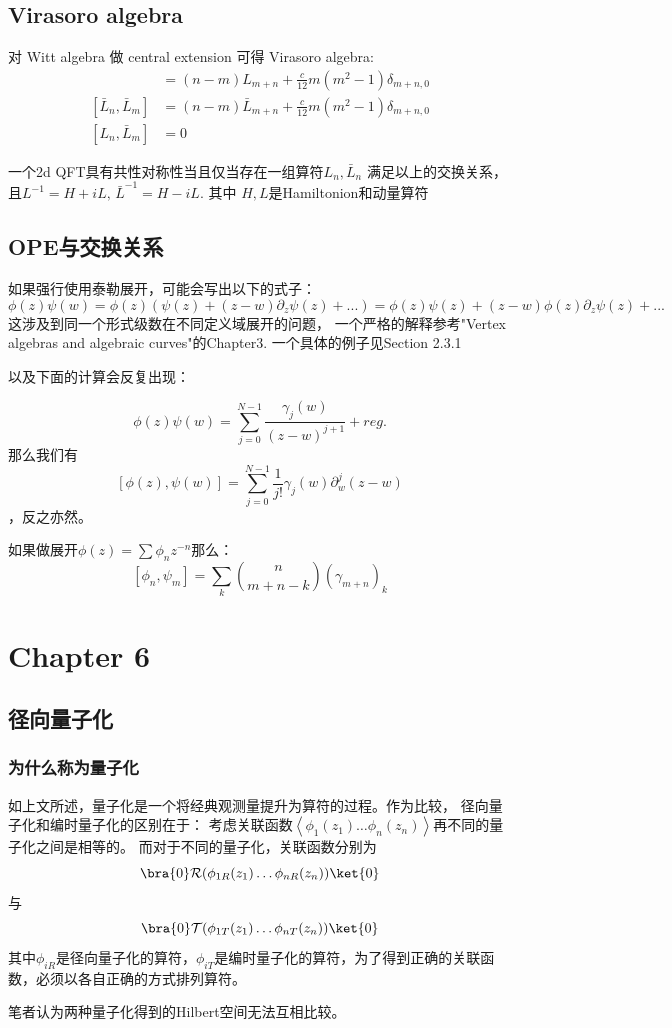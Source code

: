 \subsection{Virasoro algebra}
对 Witt algebra 做 central extension 可得 Virasoro algebra:
\begin{align*}
    [L_n,L_m]&=(n-m)L_{m+n}+\frac{c}{12}m(m^2-1)\delta_{m+n,0}\\
    [\bar L_n,\bar L_m]&=(n-m)\bar L_{m+n}+\frac{c}{12}m(m^2-1)\delta_{m+n,0}\\
    [L_n,\bar L_m]&=0
\end{align*}
\begin{definition}
    一个2d QFT具有共性对称性当且仅当存在一组算符$L_n,\bar L_n$
    满足以上的交换关系，且$L^{-1}=H+iL,\,\bar L^{-1}=H-iL $. 其中
    $H,L$是Hamiltonion和动量算符
\end{definition}
\subsection{OPE与交换关系}
如果强行使用泰勒展开，可能会写出以下的式子：
$$\phi(z)\psi(w)=\phi(z)(\psi(z)+(z-w)\partial_z\psi(z)+...)=\phi(z)\psi(z)+(z-w)\phi(z)\partial_z\psi(z)+...$$
这涉及到同一个形式级数在不同定义域展开的问题，
一个严格的解释参考"Vertex algebras and algebraic curves"的Chapter3. 一个具体的例子见Section 2.3.1

以及下面的计算会反复出现：
\begin{theorem}
    $$\phi(z)\psi(w)=\sum_{j=0}^{N-1}\frac{\gamma_j(w)}{(z-w)^{j+1}}+reg.$$
    那么我们有$$[\phi(z),\psi(w)]=\sum_{j=0}^{N-1}\frac{1}{j!}\gamma_j(w)\partial_w^j(z-w)$$
    ，反之亦然。

    如果做展开$\phi(z)=\sum \phi_n z^{-n}$那么：
$$[\phi_n,\psi_m]=\sum_k\binom{n}{m+n-k}(\gamma_{m+n})_k$$
\end{theorem}
\section{Chapter 6}
\subsection{径向量子化}
\subsubsection{为什么称为量子化}
如上文所述，量子化是一个将经典观测量提升为算符的过程。作为比较，
径向量子化和编时量子化的区别在于：
考虑关联函数$\left\langle \phi_1(z_1)\dots\phi_n(z_n) \right\rangle$再不同的量子化之间是相等的。
而对于不同的量子化，关联函数分别为
$$\bra{0} \mathcal{R}(\phi_{1R}(z_1)\dots\phi_{nR}(z_n)) \ket{0}$$
与
$$\bra{0} \mathcal{T}(\phi_{1T}(z_1)\dots\phi_{nT}(z_n)) \ket{0}$$
其中$\phi_{iR}$是径向量子化的算符，$\phi_{iT}$是编时量子化的算符，为了得到正确的关联函数，必须以各自正确的方式排列算符。
\begin{remark}
    笔者认为两种量子化得到的Hilbert空间无法互相比较。
\end{remark}
